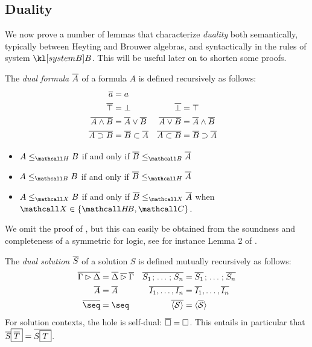 \subsection{Duality}

We now prove a number of lemmas that characterize \emph{duality} both
semantically, typically between Heyting and Brouwer algebras, and syntactically
in the rules of system $\sysB$. This will be useful later on to shorten some
proofs.

\begin{definition}
  The \emph{dual formula} $\overline{A}$ of a formula $A$ is defined recursively
  as follows:
  \begin{align*}
    \overline{a} &= a &\\
    \overline{\top} &= \bot &
    \overline{\bot} &= \top \\
    \overline{A \land B} &= \overline{A} \lor \overline{B} &
    \overline{A \lor B} &= \overline{A} \land \overline{B} \\
    \overline{A \supset B} &= \overline{B} \subset \overline{A} &
    \overline{A \subset B} &= \overline{B} \supset \overline{A}
  \end{align*}
\end{definition}

\begin{fact}[Duality]
  \sbr
  \begin{itemize}
    \item $A \sementH B$ if and only if $\soldual{B} \sementB \soldual{A}$
    \item $A \sementB B$ if and only if $\soldual{B} \sementH \soldual{A}$
    \item $A \sementX B$ if and only if $\soldual{B} \sementX \soldual{A}$ when $\ACVar
    \in \{\HeytingBrouwer, \Boolean\}$.
  \end{itemize}
\end{fact}

We omit the proof of , but this can easily be obtained from the
soundness and completeness of a symmetric  for 
logic, see for instance Lemma 2 of .

\begin{definition}
  The \emph{dual solution} $\overline{S}$ of a solution $S$ is defined
  mutually recursively as follows:
  \begin{align*}
    \soldual{\Gamma \J \Delta} &= \soldual{\Delta} \mathbin{\soldual{\J}} \soldual{\Gamma} &
    \soldual{S_1 \sep \ldots \sep S_n} &= \soldual{S_1} \sep \ldots \sep \soldual{S_n} \\
    \soldual{A} &= \soldual{A} &
    \soldual{I_1, \ldots, I_n} &= \soldual{I_1}, \ldots, \soldual{I_n} \\
    \soldual{\seq} &= {\seq} &
    \soldual{\piq{\cS}} &= \piq{\soldual{\cS}}
  \end{align*}
  For solution contexts, the hole is self-dual: $\overline{\square} = \square$. This
  entails in particular that $\overline{S}\fbox{$\overline{T}$} =
  \overline{S\fbox{$T$}}$.
\end{definition}


